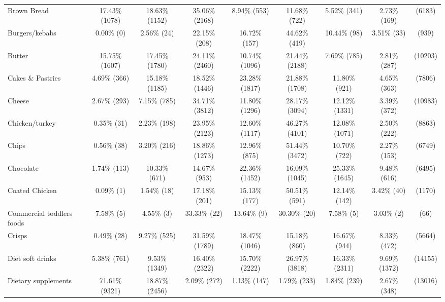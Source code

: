 \documentclass[utf8]{frontiers_suppmat} %
\begin{document}
\begin{table}[]
{\begin{tabular}{@{}lcccccccc@{}}
Brown Bread               & 17.43\%   (1078) & 18.63\%   (1152) & 35.06\%   (2168) & 8.94\%   (553)  & 11.68\%    (722) & 5.52\%   (341)  & 2.73\%   (169)  &    (6183) \\
Burgers/kebabs            & 0.00\%      (0)  & 2.56\%     (24)  & 22.15\%    (208) & 16.72\%   (157) & 44.62\%    (419) & 10.44\%    (98) & 3.51\%    (33)  &     (939) \\
Butter                    & 15.75\%   (1607) & 17.45\%   (1780) & 24.11\%   (2460) & 10.74\%  (1096) & 21.44\%   (2188) & 7.69\%   (785)  & 2.81\%   (287)  &   (10203) \\
Cakes \& Pastries         & 4.69\%    (366)  & 15.18\%   (1185) & 18.52\%   (1446) & 23.28\%  (1817) & 21.88\%   (1708) & 11.80\%   (921) & 4.65\%   (363)  &    (7806) \\
Cheese                    & 2.67\%    (293)  & 7.15\%    (785)  & 34.71\%   (3812) & 11.80\%  (1296) & 28.17\%   (3094) & 12.12\%  (1331) & 3.39\%   (372)  &   (10983) \\
Chicken/turkey            & 0.35\%     (31)  & 2.23\%    (198)  & 23.95\%   (2123) & 12.60\%  (1117) & 46.27\%   (4101) & 12.08\%  (1071) & 2.50\%   (222)  &    (8863) \\
Chips                     & 0.56\%     (38)  & 3.20\%    (216)  & 18.86\%   (1273) & 12.96\%   (875) & 51.44\%   (3472) & 10.70\%   (722) & 2.27\%   (153)  &    (6749) \\
Chocolate                 & 1.74\%    (113)  & 10.33\%    (671) & 14.67\%    (953) & 22.36\%  (1452) & 16.09\%   (1045) & 25.33\%  (1645) & 9.48\%   (616)  &    (6495) \\
Coated Chicken            & 0.09\%      (1)  & 1.54\%     (18)  & 17.18\%    (201) & 15.13\%   (177) & 50.51\%    (591) & 12.14\%   (142) & 3.42\%    (40)  &    (1170) \\
Commercial toddlers foods & 7.58\%      (5)  & 4.55\%      (3)  & 33.33\%     (22) & 13.64\%     (9) & 30.30\%     (20) & 7.58\%     (5)  & 3.03\%     (2)  &      (66) \\
Crisps                    & 0.49\%     (28)  & 9.27\%    (525)  & 31.59\%   (1789) & 18.47\%  (1046) & 15.18\%    (860) & 16.67\%   (944) & 8.33\%   (472)  &    (5664) \\
Diet soft drinks          & 5.38\%    (761)  & 9.53\%   (1349)  & 16.40\%   (2322) & 15.70\%  (2222) & 26.97\%   (3818) & 16.33\%  (2311) & 9.69\%  (1372)  &   (14155) \\
Dietary supplements       & 71.61\%   (9321) & 18.87\%   (2456) & 2.09\%    (272)  & 1.13\%   (147)  & 1.79\%    (233)  & 1.84\%   (239)  & 2.67\%   (348)  &   (13016) \\

\end{tabular}}
\end{table}
\end{document}
